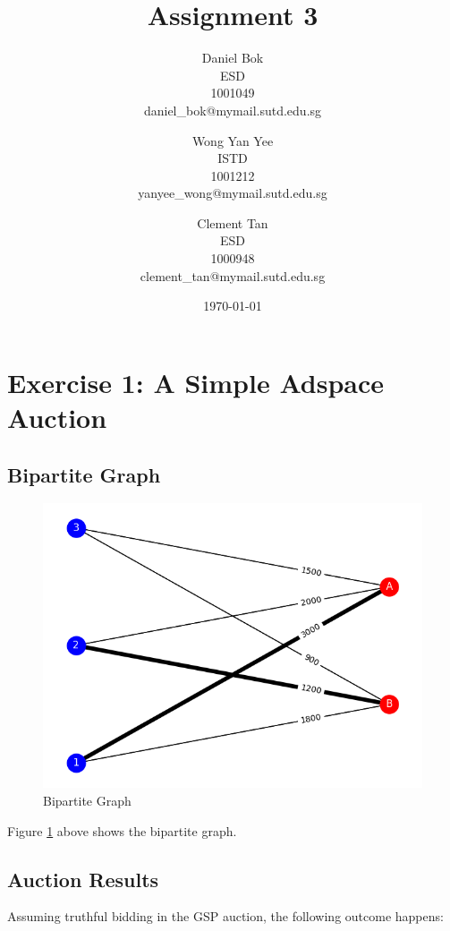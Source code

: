 \documentclass[]{article}
\title{Assignment 3}
\author{
	Daniel Bok \\
	ESD \\
	1001049 \\
	daniel\_bok@mymail.sutd.edu.sg 
	\and
	Wong Yan Yee\\ 
	ISTD \\
	1001212 \\
	yanyee\_wong@mymail.sutd.edu.sg
	\and
	Clement Tan \\
	ESD \\
	1000948 \\
	clement\_tan@mymail.sutd.edu.sg
}
\date{\today}
\begin{document}
	
\maketitle

\newpage
\tableofcontents

\newpage
\section{Exercise 1: A Simple Adspace Auction}

\subsection{Bipartite Graph}

\begin{figure}[H]
	\includegraphics[width=\linewidth]{Image-1.png}
	\caption{Bipartite Graph} 
	\label{Q1.1 Bipartite Graph}
\end{figure}

Figure \ref{Q1.1 Bipartite Graph} above shows the bipartite graph. 

\subsection{Auction Results}

Assuming truthful bidding in the GSP auction, the following outcome happens:
\end{document}
